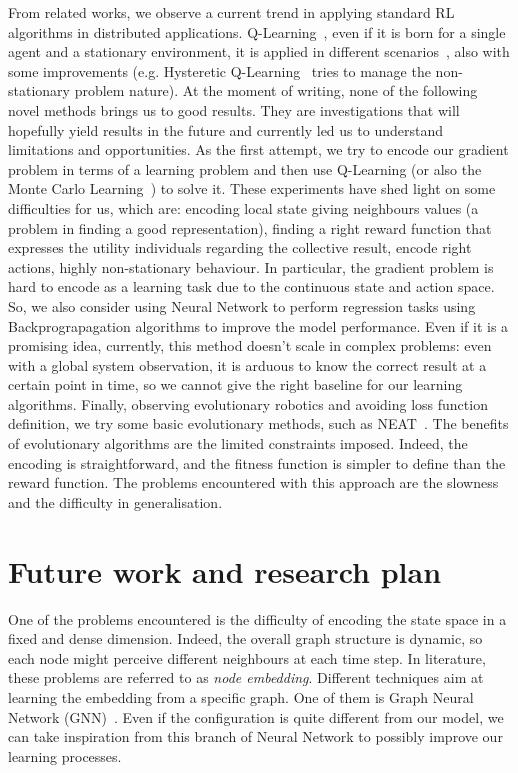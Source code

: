 \documentclass[conference]{IEEEtran}
\begin{document}
From related works, we observe a current trend in applying standard RL algorithms in distributed applications.
Q-Learning~\cite{DBLP:journals/ras/Krose95}, even if it is born for a single agent and a stationary environment, it is applied in different scenarios~\cite{DBLP:conf/mass/ShahK07}, also with some improvements (e.g. Hysteretic Q-Learning~\cite{DBLP:conf/iros/MatignonLF07} tries to manage the non-stationary problem nature).
%
At the moment of writing, none of the following novel methods brings us to good results. They are investigations that will hopefully yield results in the future and currently led us to understand limitations and opportunities.
%
As the first attempt, we try to encode our gradient problem in terms of a learning problem and then use Q-Learning (or also the Monte Carlo Learning~\cite{DBLP:conf/nips/Thrun99}) to solve it.
These experiments have shed light on some difficulties for us, which are: encoding local state giving neighbours values (a problem in finding a good representation), finding a right reward function that expresses the utility individuals
regarding the collective result, encode right actions, highly non-stationary behaviour. 
%
In particular, the gradient problem is hard to encode as a learning task due to the continuous state and action space.
So, we also consider using Neural Network to perform regression tasks using Backprograpagation algorithms to
improve the model performance. 
Even if it is a promising idea, currently, this method doesn't scale in complex problems: even with a global system observation, it is arduous to know the correct result at a certain point in time, so 
we cannot give the right baseline for our learning algorithms.
%
Finally, observing evolutionary robotics and avoiding loss function definition, we try some basic evolutionary methods, such as NEAT~\cite{DBLP:journals/ec/StanleyM02}.
The benefits of evolutionary algorithms are the limited constraints imposed. Indeed, the encoding is straightforward, and the fitness function is simpler to define than the reward function.
The problems encountered with this approach are the slowness and the difficulty in generalisation.
%
\section{Future work and research plan}
One of the problems encountered is the difficulty of encoding the state space in a fixed and dense dimension. Indeed, the overall graph structure is dynamic, so each node might perceive different neighbours at each time step.
In literature, these problems are referred to as \emph{node embedding}. Different techniques aim at learning the embedding from a specific graph. One of them is Graph Neural Network (GNN)~\cite{DBLP:journals/tnn/ScarselliGTHM09}.
Even if the configuration is quite different from our model, we can take inspiration from this branch of Neural Network to possibly improve our learning processes.
\end{document}
